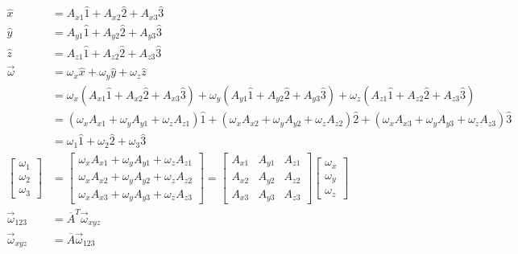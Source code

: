 \documentclass[10pt]{article}
\begin{document}
\begin{align*}
    \hat{x} &= A_{x1}\hat{1}+A_{x2}\hat{2}+A_{x3}\hat{3} \\
    \hat{y} &= A_{y1}\hat{1}+A_{y2}\hat{2}+A_{y3}\hat{3} \\
    \hat{z} &= A_{z1}\hat{1}+A_{z2}\hat{2}+A_{z3}\hat{3} \\
    \vec{\omega}&=\omega_x\hat{x}+\omega_y\hat{y}+\omega_z\hat{z} \\
    &=\omega_x\left(A_{x1}\hat{1}+A_{x2}\hat{2}+A_{x3}\hat{3} \right)
    +\omega_y\left(A_{y1}\hat{1}+A_{y2}\hat{2}+A_{y3}\hat{3}\right)
    +\omega_z\left(A_{z1}\hat{1}+A_{z2}\hat{2}+A_{z3}\hat{3}\right) \\
    &=\left(\omega_xA_{x1}+\omega_yA_{y1}+\omega_zA_{z1}\right)\hat 1
    +\left(\omega_xA_{x2}+\omega_yA_{y2}+\omega_zA_{z2}\right)\hat 2  
    +\left(\omega_xA_{x3}+\omega_yA_{y3}+\omega_zA_{z3}\right)\hat 3 \\
    &= \omega_1\hat 1 +\omega_2\hat 2 +\omega_3\hat 3 \\
    \begin{bmatrix}
        \omega_1 \\
        \omega_2 \\
        \omega_3
    \end{bmatrix}
    &=
    \begin{bmatrix}
        \omega_xA_{x1}+\omega_yA_{y1}+\omega_zA_{z1} \\
        \omega_xA_{x2}+\omega_yA_{y2}+\omega_zA_{z2} \\
        \omega_xA_{x3}+\omega_yA_{y3}+\omega_zA_{z3}
    \end{bmatrix}
    =
    \begin{bmatrix}
        A_{x1} & A_{y1} & A_{z1} \\
        A_{x2} & A_{y2} & A_{z2} \\
        A_{x3} & A_{y3} & A_{z3}
    \end{bmatrix}
    \begin{bmatrix}
        \omega_x \\
        \omega_y \\
        \omega_z
    \end{bmatrix}
    \\
    \vec{\omega}_{123} &= \overline{A}^T\vec{\omega}_{xyz} \\
    \vec{\omega}_{xyz} &= \overline{A}\vec{\omega}_{123}
\end{align*}
\end{document}

